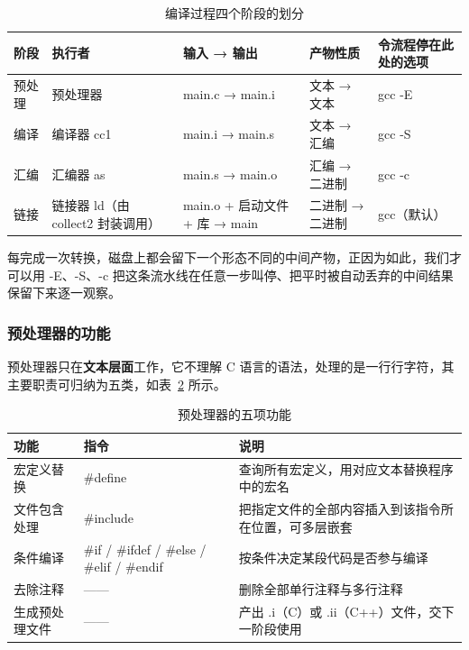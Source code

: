 \documentclass[UTF8,a4paper,10pt]{ctexart}
\newcommand{\headcol}{\bfseries}
\begin{document}
\begin{table}[H]
  \centering
  \small
  \setlength{\tabcolsep}{4pt}
  \begin{tabular}{>{\centering\arraybackslash}p{1.4cm}>{\centering\arraybackslash}p{2.6cm}>{\centering\arraybackslash}p{4.2cm}>{\centering\arraybackslash}p{2.2cm}>{\centering\arraybackslash}p{2.4cm}}
    \toprule
\headcol 阶段 & \headcol 执行者 & \headcol 输入 → 输出 & \headcol 产物性质 & \headcol 令流程停在此处的选项 \\
    \midrule
预处理 & 预处理器 & main.c → main.i & 文本 → 文本 & gcc -E \\
    编译 & 编译器 cc1 & main.i → main.s & 文本 → 汇编 & gcc -S \\
    汇编 & 汇编器 as & main.s → main.o & 汇编 → 二进制 & gcc -c \\
    链接 & 链接器 ld（由 collect2 封装调用） & main.o + 启动文件 + 库 → main & 二进制 → 二进制 & gcc（默认） \\
    \bottomrule
\end{tabular}
  \caption{编译过程四个阶段的划分}
  \label{tab:fourstage}
\end{table}

每完成一次转换，磁盘上都会留下一个形态不同的中间产物，正因为如此，我们才可以用 -E、-S、-c 把这条流水线在任意一步叫停、把平时被自动丢弃的中间结果保留下来逐一观察。

\subsubsection{预处理器的功能}

预处理器只在\textbf{文本层面}工作，它不理解 C 语言的语法，处理的是一行行字符，其主要职责可归纳为五类，如表~\ref{tab:cpp} 所示。

\begin{table}[H]
  \centering
  \small
  \setlength{\tabcolsep}{4pt}
  \begin{tabular}{>{\centering\arraybackslash}p{2.6cm}>{\centering\arraybackslash}p{4.6cm}>{\centering\arraybackslash}p{6cm}}
    \toprule
\headcol 功能 & \headcol 指令 & \headcol 说明 \\
    \midrule
宏定义替换 & \#define & 查询所有宏定义，用对应文本替换程序中的宏名 \\
    文件包含处理 & \#include & 把指定文件的全部内容插入到该指令所在位置，可多层嵌套 \\
    条件编译 & \#if / \#ifdef / \#else / \#elif / \#endif & 按条件决定某段代码是否参与编译 \\
    去除注释 & —— & 删除全部单行注释与多行注释 \\
    生成预处理文件 & —— & 产出 .i（C）或 .ii（C++）文件，交下一阶段使用 \\
    \bottomrule
\end{tabular}
  \caption{预处理器的五项功能}
  \label{tab:cpp}
\end{table}
\end{document}
